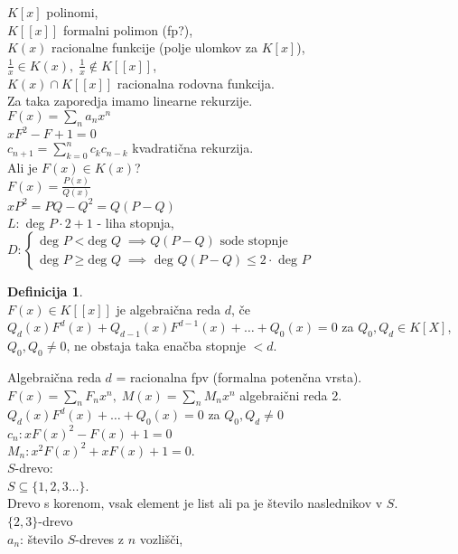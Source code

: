 \documentclass[a4paper, 12pt]{book}
\theoremstyle{definition}
\newtheorem{defn}[counter]{Definicija}
\theoremstyle{remark}
\begin{document}
$K[x]$ polinomi, \\
$K[[x]]$ formalni polimon (fp?), \\
$K(x)$ racionalne funkcije (polje ulomkov za $K[x]$), \\
$\frac{1}{x} \in K(x), \; \frac{1}{x} \notin K[[x]]$, \\
$K(x) \cap K[[x]]$ racionalna rodovna funkcija. \\
Za taka zaporedja imamo linearne rekurzije. \\
$F(x) = \sum_n a_n x^n$ \\
$xF^2 - F + 1 = 0$ \\
$c_{n+1} = \sum_{k=0}^{n} c_k c_{n-k}$ kvadratična rekurzija. \\
Ali je $F(x) \in K(x)$? \\
$F(x) = \frac{P(x)}{Q(x)}$ \\
$xP^2 = PQ - Q^2 = Q(P-Q)$ \\
$L:$ deg $P \cdot 2 + 1$ - liha stopnja, \\
$D: \begin{cases}
  \text{deg } P < \text{deg } Q \; \implies Q(P-Q) \text{ sode stopnje} \\
  \text{deg } P \geq \text{deg } Q \; \implies \text{ deg } Q(P-Q) \leq 2 \cdot \text{ deg } P
\end{cases}$
\begin{defn} \text{} \\
  $F(x) \in K[[x]]$ je algebraična reda $d$, če \\
  $Q_d(x) F^d(x) + Q_{d-1}(x) F^{d-1}(x) + \dots + Q_0(x) = 0$ za $Q_0, Q_d \in K[X]$,
  $Q_0, Q_0 \neq 0$, ne obstaja taka enačba stopnje $< d$.
\end{defn}
Algebraična reda $d$ = racionalna fpv (formalna potenčna vrsta). \\
$F(x) = \sum_n F_n x^n, \; M(x) = \sum_n M_n x^n$ algebraični reda 2. \\
%
%
%
$Q_d(x) F^d(x) + \dots + Q_0(x) = 0$ za $Q_0, Q_d \neq 0$ \\
$c_n: x F(x)^2 - F(x) + 1 = 0$ \\
$M_n: x^2 F(x)^2 + x F(x) + 1 = 0$. \\
$S$-drevo: \\
$S \subseteq \{1, 2, 3 \dots\}$. \\
Drevo s korenom, vsak element je list ali pa je število naslednikov v $S$. \\
$\{2,3\}$-drevo \\
$a_n$: število $S$-dreves z $n$ vozlišči, \\
\end{document}
